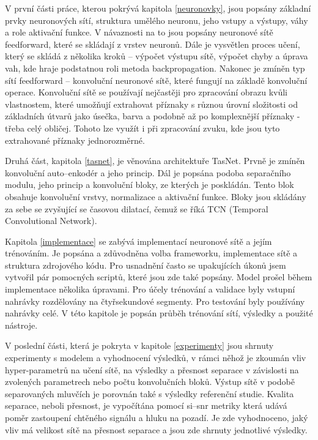V první části práce, kterou pokrývá kapitola \ref{neuronovky}, jsou popsány základní prvky neuronových sítí, struktura umělého neuronu, jeho vstupy a výstupy, váhy a role aktivační funkce. V návaznosti na to jsou popsány neuronové sítě feedforward, které se skládají z vrstev neuronů. Dále je vysvětlen proces učení, který se skládá z několika kroků -- výpočet výstupu sítě, výpočet chyby a úprava vah, kde hraje podstatnou roli metoda backpropagation. Nakonec je zmíněn typ sítí feedforward -- konvoluční neuronové sítě, které fungují na základě konvoluční operace. Konvoluční sítě se používají nejčastěji pro zpracování obrazu kvůli vlastnostem, které umožňují extrahovat příznaky s různou úrovní složitosti od základních útvarů jako úsečka, barva a podobně až po komplexnější příznaky - třeba celý obličej. Tohoto lze využít i při zpracování zvuku, kde jsou tyto extrahované příznaky jednorozměrné.

Druhá část, kapitola \ref{tasnet}, je věnována architektuře TasNet. Prvně je zmíněn konvoluční auto--enkodér a jeho princip. Dál je popsána podoba separačního modulu, jeho princip a konvoluční bloky, ze kterých je poskládán. Tento blok obsahuje konvoluční vrstvy, normalizace a aktivační funkce. Bloky jsou skládány za sebe se zvyšující se časovou dilatací, čemuž se říká TCN (Temporal Convolutional Network). 

Kapitola \ref{implementace} se zabývá implementací neuronové sítě a jejím trénováním. Je popsána a zdůvodněna volba frameworku, implementace sítě a struktura zdrojového kódu. Pro usnadnění často se upakujících úkonů jsem vytvořil pár pomocných scriptů, které jsou zde také popsány. 
Model prošel během implementace několika úpravami. Pro účely trénování a validace byly vstupní nahrávky rozdělovány na čtyřsekundové segmenty. Pro testování byly používány nahrávky celé. V této kapitole je popsán průběh trénování sítí, výsledky a použité nástroje.

V poslední části, která je pokryta v kapitole \ref{experimenty} jsou shrnuty experimenty s modelem a vyhodnocení výsledků, v rámci něhož je zkoumán vliv hyper-parametrů na učení sítě, na výsledky a přesnost separace v závislosti na zvolených parametrech nebo počtu konvolučních bloků. Výstup sítě v podobě separovaných mluvčích je porovnán také s výsledky referenční studie. Kvalita separace, neboli přesnost, je vypočítána pomocí si--snr metriky která udává poměr zastoupení chtěného signálu a hluku na pozadí. Je zde vyhodnoceno, jaký vliv má velikost sítě na přesnost separace a jsou zde shrnuty jednotlivé výsledky.

